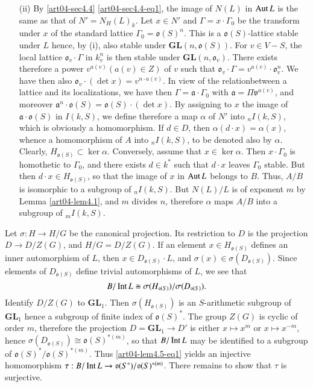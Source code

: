 \begin{itemize}
\item[(ii)] By \ref{art04-sec4.4} \eqref{art04-sec4.4-eq1}, the image of $N(L)$ in $\operatorname{\mathrm{Aut}} L$ is the same as that of $N'=N_{H}(L)_{k}$. Let $x\in N'$ and $\Gamma=x\cdot \Gamma_{0}$ be the transform under $x$ of the standard lattice $\Gamma_{0}=\mathfrak{o}(S)^{n}$. This is a $\mathfrak{o}(S)$-lattice stable under $L$ hence, by (i), also stable under $\mathbf{GL}(n,\mathfrak{o}(S))$. For $v\in V-S$, the local lattice $\mathfrak{o}_{v}\cdot \Gamma$ in $k^{n}_{v}$ is then stable under $\mathbf{GL}(n,\mathfrak{o}_{v})$. There exists therefore a power $v^{a(v)}(a(v)\in Z)$ of $v$ such that $\mathfrak{o}_{v}\cdot \Gamma=v^{a(v)}\cdot \mathfrak{o}^{n}_{v}$. We have then also $\mathfrak{o}_{v}\cdot (\det x)=v^{n\cdot a(v)}$. In view of the relation\pageoriginale between a lattice and its localizations, we have then $\Gamma=\mathfrak{a}\cdot \Gamma_{0}$ with $\mathfrak{a}=\Pi \mathfrak{v}^{a(v)}$, and moreover $\mathfrak{a}^{n}\cdot \mathfrak{o}(S)=\mathfrak{o}(S)\cdot (\det x)$. By assigning to $x$ the image of $\mathfrak{a}\cdot \mathfrak{o}(S)$ in $I(k,S)$, we define therefore a map $\alpha$ of $N'$ into ${}_{n}I(k,S)$, which is obviously a homomorphism. If $d\in D$, then $\alpha(d\cdot x)=\alpha(x)$, whence a homomorphism of $A$ into ${}_{n}I(k,S)$, to be denoted also by $\alpha$. Clearly, $H_{\mathfrak{o}(S)}\subset \ker \alpha$. Conversely, assume that $x\in\ker \alpha$. Then $x\cdot \Gamma_{0}$ is homothetic to $\Gamma_{0}$, and there exists $d\in k^{*}$ such that $d\cdot x$ leaves $\Gamma_{0}$ stable. But then $d\cdot x\in H_{\mathfrak{o}(S)}$, so that the image of $x$ in $\operatorname{\mathrm{Aut}} L$ belongs to $B$. Thus, $A/B$ is isomorphic to a subgroup of ${}_{n}I(k,S)$. But $N(L)/L$ is of exponent $m$ by Lemma \ref{art04-lem4.1}, and $m$ divides $n$, therefore $\alpha$ maps $A/B$ into a subgroup of ${}_{m}I(k,S)$.
\end{itemize}

Let $\sigma:H\to H/G$ be the canonical projection. Its restriction to $D$ is the projection $D\to D/Z(G)$, and $H/G=D/Z(G)$. If an element $x\in H_{\mathfrak{o}(S)}$ defines an inner automorphism of $L$, then $x\in D_{\mathfrak{o}(S)}\cdot L$, and $\sigma(x)\in \sigma(D_{\mathfrak{o}(S)})$. Since elements of $D_{\mathfrak{o}(S)}$ define trivial automorphisms of $L$, we see that
\setcounter{equation}{0}
\begin{equation}
B/\operatorname{\mathrm{Int}} L\cong \sigma (H_{\mathfrak{o}(S)})/\sigma(D_{\mathfrak{o}(S)}).\label{art04-lem4.5-eq1}
\end{equation}
Identify $D/Z(G)$ to $\mathbf{GL}_{1}$. Then $\sigma(H_{\mathfrak{o}(S)})$ is an $S$-arithmetic subgroup of $\mathbf{GL}_{1}$ hence a subgroup of finite index of $\mathfrak{o}(S)^{*}$. The group $Z(G)$ is cyclic of order $m$, therefore the projection $D=\mathbf{GL}_{1}\to D'$ is either $x\mapsto x^{m}$ or $x\mapsto x^{-m}$, hence $\sigma(D_{\mathfrak{o}(S)})\cong \mathfrak{o}(S)^{*(m)}$, so that $B/\operatorname{\mathrm{Int}} L$ may be identified to a subgroup of $\mathfrak{o}(S)^{*}/\mathfrak{o}(S)^{*(m)}$. Thus \eqref{art04-lem4.5-eq1} yields an injective homomorphism $\tau : B/\operatorname{\mathrm{Int}} L\to \mathfrak{o}(S^{*})/\mathfrak{o}(S)^{*(m)}$. There remains to show that $\tau$ is surjective.


